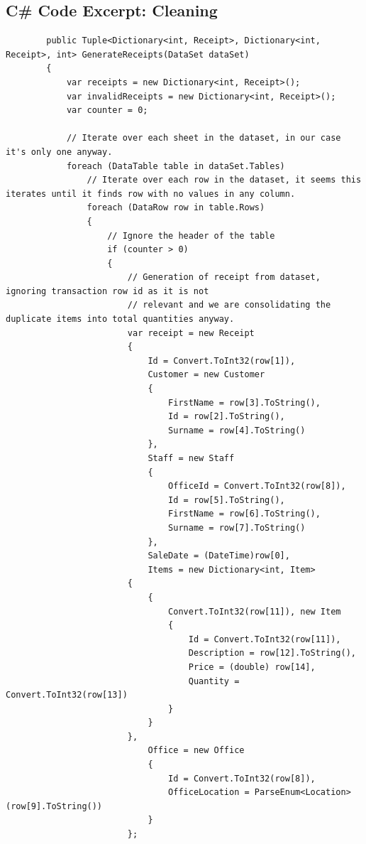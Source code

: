 \documentclass{article}
\begin{document}
    \subsection{C\# Code Excerpt: Cleaning}
    \label{sec:sharpccleaning}
    \lstset{style=sharpc}
    \begin{lstlisting}
        public Tuple<Dictionary<int, Receipt>, Dictionary<int, Receipt>, int> GenerateReceipts(DataSet dataSet)
        {
            var receipts = new Dictionary<int, Receipt>();
            var invalidReceipts = new Dictionary<int, Receipt>();
            var counter = 0;

            // Iterate over each sheet in the dataset, in our case it's only one anyway.
            foreach (DataTable table in dataSet.Tables)
                // Iterate over each row in the dataset, it seems this iterates until it finds row with no values in any column.
                foreach (DataRow row in table.Rows)
                {
                    // Ignore the header of the table
                    if (counter > 0)
                    {
                        // Generation of receipt from dataset, ignoring transaction row id as it is not 
                        // relevant and we are consolidating the duplicate items into total quantities anyway. 
                        var receipt = new Receipt
                        {
                            Id = Convert.ToInt32(row[1]),
                            Customer = new Customer
                            {
                                FirstName = row[3].ToString(),
                                Id = row[2].ToString(),
                                Surname = row[4].ToString()
                            },
                            Staff = new Staff
                            {
                                OfficeId = Convert.ToInt32(row[8]),
                                Id = row[5].ToString(),
                                FirstName = row[6].ToString(),
                                Surname = row[7].ToString()
                            },
                            SaleDate = (DateTime)row[0],
                            Items = new Dictionary<int, Item>
                        {
                            {
                                Convert.ToInt32(row[11]), new Item
                                {
                                    Id = Convert.ToInt32(row[11]),
                                    Description = row[12].ToString(),
                                    Price = (double) row[14],
                                    Quantity = Convert.ToInt32(row[13])
                                }
                            }
                        },
                            Office = new Office
                            {
                                Id = Convert.ToInt32(row[8]),
                                OfficeLocation = ParseEnum<Location>(row[9].ToString())
                            }
                        };






\end{lstlisting}
\end{document}
